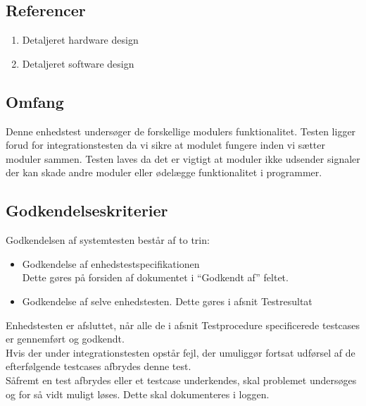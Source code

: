 \subsection{Referencer}
\begin{enumerate}
\item Detaljeret hardware design
\item Detaljeret software design
\end{enumerate}
\subsection{Omfang}
Denne enhedstest undersøger de forskellige modulers funktionalitet. Testen ligger forud for integrationstesten da vi sikre at modulet fungere inden vi sætter moduler sammen. Testen laves da det er vigtigt at moduler ikke udsender signaler der kan skade andre moduler eller ødelægge funktionalitet i programmer. 
\subsection{Godkendelseskriterier}
Godkendelsen af systemtesten består af to trin:\\
\begin{itemize}
\item Godkendelse af enhedstestspecifikationen\\
Dette gøres på forsiden af dokumentet i “Godkendt af” feltet.
\item Godkendelse af selve enhedstesten. Dette gøres i afsnit Testresultat
\end{itemize}
Enhedstesten er afsluttet, når alle de i afsnit Testprocedure specificerede testcases er gennemført og godkendt.\\
Hvis der under integrationstesten opstår fejl, der umuliggør fortsat udførsel af de efterfølgende testcases afbrydes denne test.\\
Såfremt en test afbrydes eller et testcase underkendes, skal problemet undersøges og for så vidt muligt løses. Dette skal dokumenteres i loggen.\\
